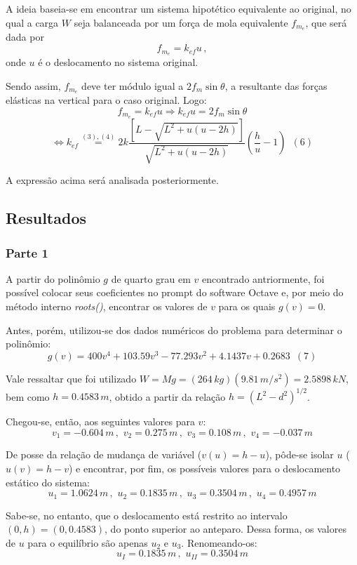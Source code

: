 \documentclass[a4paper, 12pt]{article}
\begin{document}
	A ideia baseia-se em encontrar um sistema hipotético equivalente ao original, no qual a carga $W$ seja balanceada 
	por um força de mola equivalente $f_{m_e}$, que será dada por $$f_{m_e}=k_{ef}u\,,$$ onde $u$ é o deslocamento
	no sistema original.
	
	Sendo assim, $f_{m_e}$ deve ter módulo igual a $2f_m\sin \theta$, a resultante das forças elásticas na vertical 
	para o caso original. Logo: $$f_{m_e}=k_{ef}u \Longrightarrow k_{ef}u=2f_m\sin \theta$$
	$$\Longleftrightarrow k_{ef}\stackrel{(3),(4)}{=}2k\frac{\left[L-\sqrt{L^2+u(u-2h)}\right]}{
	\sqrt{L^2+u(u-2h)}}\left(\frac{h}{u}-1\right)\,\,\,(6)$$ $$ $$
	
	A expressão acima será analisada posteriormente.
	
	\newpage
	
	\subsection{Resultados}
	
	\subsubsection{Parte 1}
	
	A partir do polinômio $g$ de quarto grau em $v$ encontrado antriormente, foi possível colocar seus coeficientes no
	prompt do software Octave e, por meio do método interno \textit{roots()}, encontrar os valores de $v$ para os quais
	$g(v)=0$.
	
	Antes, porém, utilizou-se dos dados numéricos do problema para determinar o polinômio:
	$$g(v)=400v^4+103.59v^3-77.293v^2+4.1437v+0.2683\,\,\,(7)$$
	
	Vale ressaltar que foi utilizado $W=Mg=(264\,kg)(9.81\,m/s^2)=2.5898\,kN$, bem como $h=0.4583\,m$, obtido a partir
	da relação $h=(L^2-d^2)^{1/2}$.
	
	Chegou-se, então, aos seguintes valores para $v$: $$v_1=-0.604\,m\,,\,\,v_2=0.275\,m\,,\,\,v_3=0.108\,m
	\,,\,\,v_4=-0.037\,m$$
	
	De posse da relação de mudança de variável ($v(u)=h-u$), pôde-se isolar $u$ ($u(v)=h-v$) e encontrar, por fim, os 
	possíveis valores para o deslocamento estático do sistema:
	$$u_1=1.0624\,m\,,\,\,u_2=0.1835\,m\,,\,\,u_3=0.3504\,m\,,\,\,u_4=0.4957\,m$$
	
	Sabe-se, no entanto, que o deslocamento está restrito ao intervalo $(0,h)=(0,0.4583)$, do ponto superior ao anteparo.
	Dessa forma, os valores de $u$ para o equilíbrio são apenas $u_2$ e $u_3$. Renomeando-os:
	$$u_I=0.1835\,m\,,\,\,u_{II}=0.3504\,m$$
	
\end{document}
